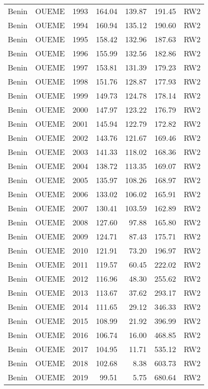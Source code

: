 \begin{longtable}{lllrrrl}
  Benin & OUEME & 1993 & 164.04 & 139.87 & 191.45 & RW2 \\ 
  Benin & OUEME & 1994 & 160.94 & 135.12 & 190.60 & RW2 \\ 
  Benin & OUEME & 1995 & 158.42 & 132.96 & 187.63 & RW2 \\ 
  Benin & OUEME & 1996 & 155.99 & 132.56 & 182.86 & RW2 \\ 
  Benin & OUEME & 1997 & 153.81 & 131.39 & 179.23 & RW2 \\ 
  Benin & OUEME & 1998 & 151.76 & 128.87 & 177.93 & RW2 \\ 
  Benin & OUEME & 1999 & 149.73 & 124.78 & 178.14 & RW2 \\ 
  Benin & OUEME & 2000 & 147.97 & 123.22 & 176.79 & RW2 \\ 
  Benin & OUEME & 2001 & 145.94 & 122.79 & 172.82 & RW2 \\ 
  Benin & OUEME & 2002 & 143.76 & 121.67 & 169.46 & RW2 \\ 
  Benin & OUEME & 2003 & 141.33 & 118.02 & 168.36 & RW2 \\ 
  Benin & OUEME & 2004 & 138.72 & 113.35 & 169.07 & RW2 \\ 
  Benin & OUEME & 2005 & 135.97 & 108.26 & 168.97 & RW2 \\ 
  Benin & OUEME & 2006 & 133.02 & 106.02 & 165.91 & RW2 \\ 
  Benin & OUEME & 2007 & 130.41 & 103.59 & 162.89 & RW2 \\ 
  Benin & OUEME & 2008 & 127.60 & 97.88 & 165.80 & RW2 \\ 
  Benin & OUEME & 2009 & 124.71 & 87.43 & 175.71 & RW2 \\ 
  Benin & OUEME & 2010 & 121.91 & 73.20 & 196.97 & RW2 \\ 
  Benin & OUEME & 2011 & 119.57 & 60.45 & 222.02 & RW2 \\ 
  Benin & OUEME & 2012 & 116.96 & 48.30 & 255.62 & RW2 \\ 
  Benin & OUEME & 2013 & 113.67 & 37.62 & 293.17 & RW2 \\ 
  Benin & OUEME & 2014 & 111.65 & 29.12 & 346.33 & RW2 \\ 
  Benin & OUEME & 2015 & 108.99 & 21.92 & 396.99 & RW2 \\ 
  Benin & OUEME & 2016 & 106.74 & 16.00 & 468.85 & RW2 \\ 
  Benin & OUEME & 2017 & 104.95 & 11.71 & 535.12 & RW2 \\ 
  Benin & OUEME & 2018 & 102.68 & 8.38 & 603.73 & RW2 \\ 
  Benin & OUEME & 2019 & 99.51 & 5.75 & 680.64 & RW2 \\ 

\end{longtable}
